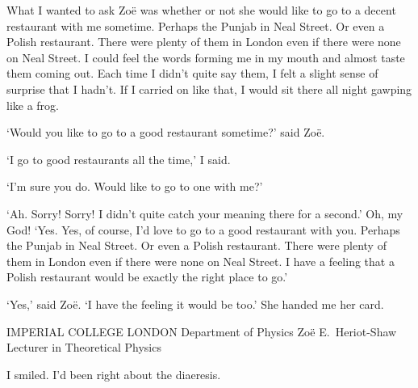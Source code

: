 What I wanted to ask Zoë was whether or not she would like to go
to a decent restaurant with me sometime. Perhaps the Punjab in Neal Street. Or even a Polish restaurant. There were plenty of them in London even if there were none on Neal Street. I could feel the words forming me in my mouth and
almost taste them coming out. Each time I didn't quite say them, I
felt a slight sense of surprise that I hadn't. If I
carried on like that, I would sit there all night gawping like a
frog.

`Would you like to go to a good restaurant sometime?' said Zoë.

`I go to good restaurants all the time,' I said.

`I'm sure you do. Would like to go to one with {\twelveit me}?'

`Ah. Sorry! Sorry! I didn't quite catch your
meaning there for a second.' Oh, my God! `Yes. Yes, of course, I'd
love to go to a good restaurant with you. Perhaps the Punjab in Neal Street. Or even a Polish restaurant. There were plenty of them in London even if there were none on Neal Street. I have a feeling that a Polish restaurant would be exactly the right place to go.'

`Yes,' said Zoë. `I have the feeling it would be too.' She handed me her card.

\startcard
IMPERIAL COLLEGE LONDON
Department of Physics
Zoë E.~Heriot-Shaw
Lecturer in Theoretical Physics
\stopcard

I smiled. I'd been right about the diaeresis.
\vfill\eject

